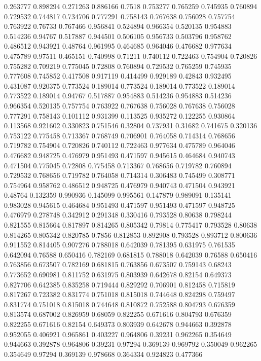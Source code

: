 0.263777 0.898294
0.271263 0.886166
0.7518 0.753277
0.765259 0.745935
0.760894 0.729532
0.744817 0.734706
0.777291 0.758143
0.767638 0.756028
0.757754 0.763922
0.76733 0.767466
0.956841 0.524894
0.966354 0.520135
0.954883 0.514236
0.94767 0.517887
0.944501 0.506105
0.956733 0.503796
0.958762 0.486512
0.943921 0.48764
0.961995 0.464685
0.964046 0.476682
0.977634 0.475789
0.97511 0.465151
0.740998 0.71211
0.740112 0.722463
0.754904 0.720826
0.755282 0.709219
0.775045 0.72808
0.760894 0.729532
0.765259 0.745935
0.777608 0.745852
0.417508 0.917119
0.414499 0.929189
0.42843 0.932495
0.431087 0.920375
0.773524 0.189014
0.773524 0.189014
0.773522 0.189014
0.773522 0.189014
0.94767 0.517887
0.954883 0.514236
0.954883 0.514236
0.966354 0.520135
0.757754 0.763922
0.767638 0.756028
0.767638 0.756028
0.777291 0.758143
0.101112 0.931399
0.113525 0.935272
0.122255 0.930864
0.113568 0.921602
0.330823 0.751546
0.32804 0.737931
0.31682 0.741675
0.320136 0.753122
0.775458 0.713367
0.768749 0.706901
0.764058 0.714314
0.768656 0.719782
0.754904 0.720826
0.740112 0.722463
0.977634 0.475789
0.964046 0.476682
0.948725 0.476979
0.951493 0.471597
0.945615 0.464684
0.940743 0.471504
0.775045 0.72808
0.775458 0.713367
0.768656 0.719782
0.760894 0.729532
0.768656 0.719782
0.764058 0.714314
0.306483 0.745499
0.308771 0.754964
0.958762 0.486512
0.948725 0.476979
0.940743 0.471504
0.943921 0.48764
0.132359 0.990936
0.145099 0.995561
0.147879 0.989091
0.135141 0.983028
0.945615 0.464684
0.951493 0.471597
0.951493 0.471597
0.948725 0.476979
0.278748 0.342912
0.291348 0.330416
0.793528 0.80638
0.798244 0.821555
0.815664 0.817897
0.814265 0.805342
0.79814 0.775417
0.793528 0.80638
0.814265 0.805342
0.820785 0.7856
0.812853 0.892908
0.793528 0.893712
0.800636 0.911552
0.814405 0.907276
0.788018 0.642039
0.781395 0.631975
0.761535 0.642094
0.76588 0.650416
0.782169 0.681815
0.788018 0.642039
0.76588 0.650416
0.763856 0.673507
0.782169 0.681815
0.763856 0.673507
0.759143 0.68243
0.773652 0.690981
0.811752 0.631975
0.803939 0.642678
0.82154 0.649373
0.827706 0.642385
0.835258 0.719444
0.829292 0.706901
0.812458 0.715819
0.817267 0.723382
0.831774 0.751018
0.815018 0.744648
0.824298 0.759497
0.831774 0.751018
0.815018 0.744648
0.810872 0.752588
0.804793 0.676359
0.813574 0.687002
0.826959 0.68059
0.822255 0.671616
0.804793 0.676359
0.822255 0.671616
0.82154 0.649373
0.803939 0.642678
0.944663 0.392878
0.952055 0.406921
0.965861 0.403227
0.964806 0.39231
0.962265 0.354649
0.944663 0.392878
0.964806 0.39231
0.97294 0.369139
0.969792 0.350049
0.962265 0.354649
0.97294 0.369139
0.978668 0.364334
0.924823 0.477366
